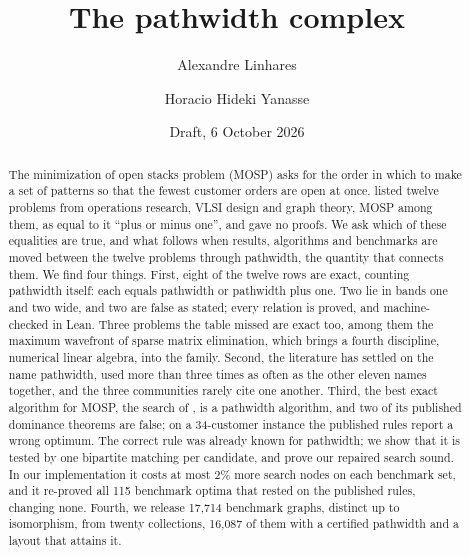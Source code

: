 \documentclass[11pt,letterpaper]{article}
\title{The pathwidth complex}
\author{Alexandre Linhares\\{\small\fbox{affiliation to be added}} \and
Horacio Hideki Yanasse\\{\small\fbox{affiliation to be added}}}
\date{Draft, 6 October 2026}
\numberwithin{figure}{section}
\numberwithin{table}{section}
\theoremstyle{plain}
\theoremstyle{definition}
\theoremstyle{remark}
\begin{document}
\maketitle

\begin{abstract}
\noindent
The minimization of open stacks problem (MOSP) asks for the order in which to
make a set of patterns so that the fewest customer orders are open at once.
\citet{LY2002} listed twelve problems from operations research, VLSI design and
graph theory, MOSP among them, as equal to it ``plus or minus one'', and gave
no proofs. We ask which of these equalities are true, and what follows when
results, algorithms and benchmarks are moved between the twelve problems
through pathwidth, the quantity that connects them. We find four things. First,
eight of the twelve rows are exact, counting pathwidth itself: each equals
pathwidth or pathwidth plus one. Two lie in bands one and two wide, and two are
false as stated; every relation is proved, and machine-checked in Lean.
Three problems the table missed are exact too, among them the maximum
wavefront of sparse matrix elimination, which brings a fourth discipline,
numerical linear algebra, into the family.
Second, the literature has settled on the name pathwidth, used more than three
times as often as the other eleven names together, and the three communities
rarely cite one another. Third, the best exact algorithm for MOSP, the search of
\citet{ChuStuckey2009}, is a pathwidth algorithm, and two of its published
dominance theorems are false; on a 34-customer instance the published rules
report a wrong optimum. The correct rule was already known for
pathwidth; we show that it is tested by one bipartite matching per candidate,
and prove our repaired search sound. In our implementation it costs at most
2\% more search nodes on each benchmark set, and it re-proved all 115 benchmark
optima that rested on the published rules, changing none. Fourth, we release
17,714 benchmark graphs, distinct up to isomorphism, from twenty collections,
16,087 of them with a certified pathwidth and a layout that attains it.
\end{abstract}











\appendix




\end{document}
